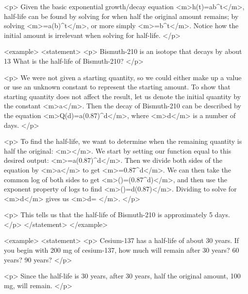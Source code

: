         <p>
            Given the basic exponential growth/decay equation <m>h(t)=ab^{t}</m>, half-life can be found by solving for when half the original amount remains; by solving <m>=a(b)^{t}</m>, or more simply <m>=b^{t}</m>.
            Notice how the initial amount is irrelevant when solving for half-life.
        </p>

        <example>
            <statement>
                <p>
                    Bismuth-210 is an isotope that decays by about 13%
                    What is the half-life of Bismuth-210?
                </p>

                <p>
                    We were not given a starting quantity, so we could either make up a value or use an unknown constant to represent the starting amount.
                    To show that starting quantity does not affect the result, let us denote the initial quantity by the constant <m>a</m>.
                    Then the decay of Bismuth-210 can be described by the equation <m>Q(d)=a(0.87)^{d}</m>, where <m>d</m> is a number of days.
                </p>

                <p>
                    To find the half-life, we want to determine when the remaining quantity is half the original: <m></m>.
                    We start by setting our function equal to this desired output: <m>=a(0.87)^{d}</m>.
                    Then we divide both sides of the equation by <m>a</m> to get <m>=0.87^{d}</m>.
                    We can then take the common log of both sides to get <m>\log()=\log(0.87^{d})</m>, and then use the exponent property of logs to find <m>\log()=d\log(0.87)</m>.
                    Dividing to solve for <m>d</m> gives us <m>d= </m>.
                </p>

                <p>
                    This tells us that the half-life of Bismuth-210 is approximately 5 days.
                </p>
            </statement>
        </example>

        <example>
            <statement>
                <p>
                    Cesium-137 has a half-life of about 30 years.
                    If you begin with 200 mg of cesium-137, how much will remain after 30 years? 60 years? 90 years?
                </p>

                <p>
                    Since the half-life is 30 years, after 30 years, half the original amount, 100 mg, will remain.
                </p>

